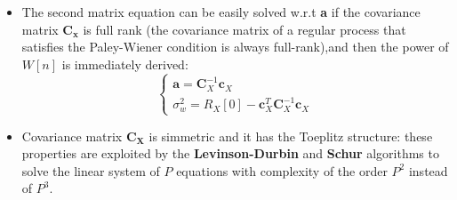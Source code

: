 \begin{itemize}
\[\begin{bmatrix}
\end{bmatrix}
=
\begin{bmatrix}
\sigma_w^2 \\ 0
\end{bmatrix}
\;\;\Longrightarrow\;\;
\begin{cases}
R_X[0] - \mathbf{c}_X^{T}\mathbf{a} = \sigma_w^2 \\[4pt]
\mathbf{c}_X - \mathbf{C}_X \mathbf{a} = 0
\end{cases}
\]
\item The second matrix equation can be easily solved w.r.t \textbf{a} if the covariance matrix \(\mathbf{C_x}\) is full rank (the covariance matrix of a regular process that satisfies the Paley-Wiener condition is always full-rank),and then the power of \(W[n]\) is immediately derived:
\[\boxed{\begin{cases}
\mathbf{a} = \mathbf{C}_X^{-1}\mathbf{c}_X \\[4pt]
\sigma_w^{2} = R_X[0] - \mathbf{c}_X^{T}\mathbf{C}_X^{-1}\mathbf{c}_X
\end{cases}}
\]
\item Covariance matrix \(\mathbf{C_X}\) is simmetric and it has the Toeplitz structure: these properties are exploited by the \textbf{Levinson-Durbin} and \textbf{Schur} algorithms to solve the linear system of \(P\) equations with complexity of the order \(P^2\) instead of \(P^3\).
\end{itemize}
